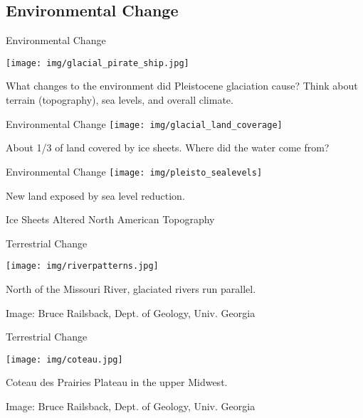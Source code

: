 \documentclass[xcolor=svgnames]{beamer}
\begin{document}
\subsection{Environmental Change}

\begin{frame}{Environmental Change}
		\begin{center}
			\texttt{[image: img/glacial\_pirate\_ship.jpg]}
			\begin{block}{}
				What changes to the environment did Pleistocene glaciation cause? Think about terrain (topography), sea levels, and overall climate.
			\end{block}
		\end{center}
\end{frame}

\begin{frame}{Environmental Change}
	\texttt{[image: img/glacial\_land\_coverage]}
	\begin{block}{}
		About 1/3 of land covered by ice sheets. \pause 
		Where did the water come from?
	\end{block}
\end{frame}

\begin{frame}{Environmental Change}
	\texttt{[image: img/pleisto\_sealevels]}
	\begin{block}{}
		New land exposed by sea level reduction.
	\end{block}
\end{frame}


{
\begin{frame}{Ice Sheets Altered North American Topography}
\end{frame}
}
\begin{frame}{Terrestrial Change}
		\begin{center}
			\texttt{[image: img/riverpatterns.jpg]}
			\begin{block}{}
				North of the Missouri River, glaciated rivers run parallel.
			\end{block}
		\end{center}
		{\hfill\tiny{Image: Bruce Railsback, Dept. of Geology, Univ. Georgia}}
\end{frame}

\begin{frame}{Terrestrial Change}
		\begin{center}
			\texttt{[image: img/coteau.jpg]}
			\begin{block}{}
				Coteau des Prairies Plateau in the upper Midwest.
			\end{block}
		\end{center}
		{\hfill\tiny{Image: Bruce Railsback, Dept. of Geology, Univ. Georgia}}
\end{frame}
\end{document}
